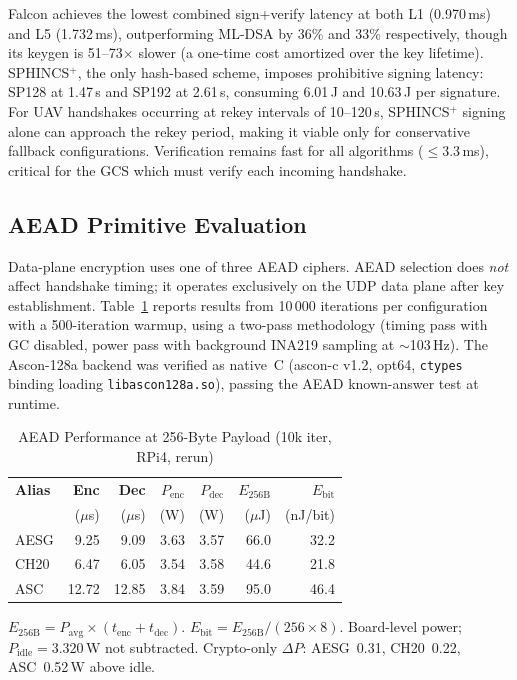Falcon achieves the lowest combined sign+verify latency at both L1
(0.970\,ms) and L5 (1.732\,ms), outperforming ML-DSA by 36\% and 33\%
respectively, though its keygen is 51--73$\times$ slower (a
one-time cost amortized over the key lifetime).  SPHINCS$^+$, the only
hash-based scheme, imposes prohibitive signing latency: SP128 at
1.47\,s and SP192 at 2.61\,s, consuming 6.01\,J and 10.63\,J per
signature.  For UAV handshakes occurring at rekey intervals of
10--120\,s, SPHINCS$^+$ signing alone can approach the rekey period,
making it viable only for conservative fallback configurations.
Verification remains fast for all algorithms ($\leq$3.3\,ms), critical
for the GCS which must verify each incoming handshake.

\subsection{AEAD Primitive Evaluation}
\label{sec:aead}

Data-plane encryption uses one of three AEAD ciphers.  AEAD selection
does \emph{not} affect handshake timing; it operates exclusively on the
UDP data plane after key establishment.  Table~\ref{tab:aead} reports
results from 10\,000 iterations per configuration with a 500-iteration
warmup, using a two-pass methodology (timing pass with GC disabled,
power pass with background INA219 sampling at $\sim$103\,Hz).
The Ascon-128a backend was verified as native~C (ascon-c v1.2, opt64,
\texttt{ctypes} binding loading \texttt{libascon128a.so}), passing the
AEAD known-answer test at runtime.

\begin{table}[t]
\centering
\caption{AEAD Performance at 256-Byte Payload (10k iter, RPi4, rerun)}
\label{tab:aead}
\footnotesize
\begin{tabular}{@{}lrrrrrr@{}}
\toprule
\textbf{Alias} &
  \textbf{Enc} & \textbf{Dec} &
  \textbf{$P_\text{enc}$} & \textbf{$P_\text{dec}$} &
  \textbf{$E_\text{256B}$} & \textbf{$E_\text{bit}$} \\
& ($\mu$s) & ($\mu$s) & (W) & (W) & ($\mu$J) & (nJ/bit) \\
\midrule
AESG & 9.25  & 9.09  & 3.63 & 3.57 & 66.0  & 32.2 \\
CH20 & 6.47  & 6.05  & 3.54 & 3.58 & 44.6  & 21.8 \\
ASC  & 12.72 & 12.85 & 3.84 & 3.59 & 95.0  & 46.4 \\
\bottomrule
\end{tabular}
\begin{tablenotes}
\footnotesize
\item $E_\text{256B} = P_\text{avg} \times (t_\text{enc} + t_\text{dec})$.
  $E_\text{bit} = E_\text{256B} / (256 \times 8)$.
  Board-level power; $P_\text{idle} = 3.320$\,W not subtracted.
  Crypto-only $\Delta P$: AESG~0.31, CH20~0.22, ASC~0.52\,W above idle.
\end{tablenotes}
\end{table}

